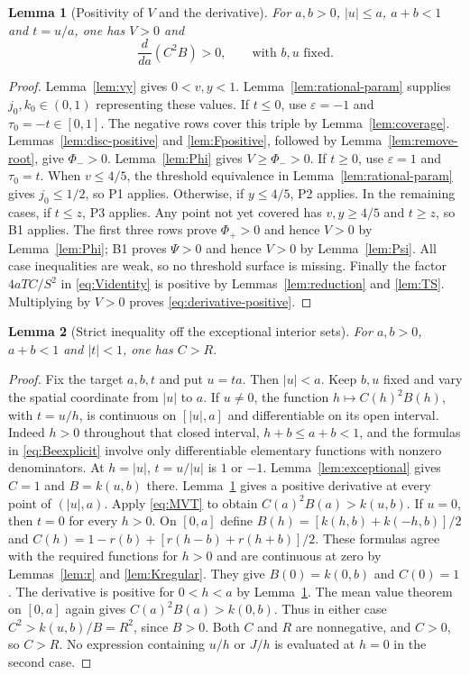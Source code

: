 \documentclass[11pt,a4paper]{article}
\newtheorem{lemma}{Lemma}[section]
\theoremstyle{definition}
\newcommand{\E}[2]{\refstepcounter{equation}\[#2\tag{\theequation}\label{eq:#1}\]}
\begin{document}
\begin{lemma}[Positivity of $V$ and the derivative]\label{lem:Vpositive}
For $a,b>0$, $|u|\leq a$, $a+b<1$ and $t=u/a$, one has $V>0$ and
\E{derivative-positive}{\frac{d}{da}(C^2B)>0,\qquad\text{with $b,u$ fixed}.}
\end{lemma}
\begin{proof}
Lemma~\ref{lem:vy} gives $0<v,y<1$. Lemma~\ref{lem:rational-param} supplies $j_0,k_0\in(0,1)$ representing these values.
If $t\leq0$, use $\varepsilon=-1$ and $\tau_0=-t\in[0,1]$. The negative rows cover this triple by Lemma~\ref{lem:coverage}. Lemmas~\ref{lem:disc-positive} and \ref{lem:Fpositive}, followed by Lemma~\ref{lem:remove-root}, give $\Phi_->0$. Lemma~\ref{lem:Phi} gives $V\geq\Phi_->0$.
If $t\geq0$, use $\varepsilon=1$ and $\tau_0=t$. When $v\leq4/5$, the threshold equivalence in Lemma~\ref{lem:rational-param} gives $j_0\leq1/2$, so P1 applies. Otherwise, if $y\leq4/5$, P2 applies. In the remaining cases, if $t\leq z$, P3 applies. Any point not yet covered has $v,y\geq4/5$ and $t\geq z$, so B1 applies. The first three rows prove $\Phi_+>0$ and hence $V>0$ by Lemma~\ref{lem:Phi}; B1 proves $\Psi>0$ and hence $V>0$ by Lemma~\ref{lem:Psi}. All case inequalities are weak, so no threshold surface is missing.
Finally the factor $4aTC/S^2$ in \eqref{eq:Videntity} is positive by Lemmas~\ref{lem:reduction} and \ref{lem:TS}. Multiplying by $V>0$ proves \eqref{eq:derivative-positive}.
\end{proof}

\begin{lemma}[Strict inequality off the exceptional interior sets]\label{lem:interior-strict}
For $a,b>0$, $a+b<1$ and $|t|<1$, one has $C>R$.
\end{lemma}
\begin{proof}
Fix the target $a,b,t$ and put $u=ta$. Then $|u|<a$. Keep $b,u$ fixed and vary the spatial coordinate from $|u|$ to $a$.
If $u\ne0$, the function $h\mapsto C(h)^2B(h)$, with $t=u/h$, is continuous on $[|u|,a]$ and differentiable on its open interval. Indeed $h>0$ throughout that closed interval, $h+b\leq a+b<1$, and the formulas in \eqref{eq:Beexplicit} involve only differentiable elementary functions with nonzero denominators. At $h=|u|$, $t=u/|u|$ is $1$ or $-1$. Lemma~\ref{lem:exceptional} gives $C=1$ and $B=k(u,b)$ there.
Lemma~\ref{lem:Vpositive} gives a positive derivative at every point of $(|u|,a)$. Apply \eqref{eq:MVT} to obtain $C(a)^2B(a)>k(u,b)$.
If $u=0$, then $t=0$ for every $h>0$. On $[0,a]$ define
$B(h)=[k(h,b)+k(-h,b)]/2$ and
$C(h)=1-r(b)+[r(h-b)+r(h+b)]/2$.
These formulas agree with the required functions for $h>0$ and are continuous at zero by Lemmas~\ref{lem:r} and \ref{lem:Kregular}. They give $B(0)=k(0,b)$ and $C(0)=1$. The derivative is positive for $0<h<a$ by Lemma~\ref{lem:Vpositive}. The mean value theorem on $[0,a]$ again gives $C(a)^2B(a)>k(0,b)$.
Thus in either case $C^2>k(u,b)/B=R^2$, since $B>0$. Both $C$ and $R$ are nonnegative, and $C>0$, so $C>R$. No expression containing $u/h$ or $J/h$ is evaluated at $h=0$ in the second case.
\end{proof}
\end{document}
